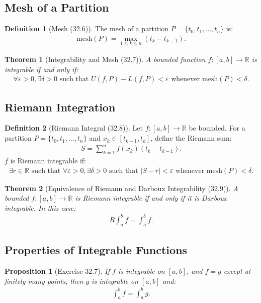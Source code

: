 \documentclass[9pt]{article}
\theoremstyle{definition}
\newtheorem{definition}{Definition}
\theoremstyle{plain}
\newtheorem{theorem}{Theorem}
\newtheorem{proposition}{Proposition}
\begin{document}
\subsection*{Mesh of a Partition}
\begin{definition}[Mesh (32.6)]
The mesh of a partition $ P = \{t_0, t_1, \ldots, t_n\} $ is:
\begin{align}
\text{mesh}(P) = \max_{1 \leq k \leq n} (t_k - t_{k-1}).
\end{align}
\end{definition}

\begin{theorem}[Integrability and Mesh (32.7)]
A bounded function $ f : [a, b] \to \mathbb{R} $ is integrable if and only if:
\begin{align}
\forall \varepsilon > 0, \exists \delta > 0 \text{ such that } U(f, P) - L(f, P) < \varepsilon \text{ whenever mesh}(P) < \delta.
\end{align}
\end{theorem}

\subsection*{Riemann Integration}
\begin{definition}[Riemann Integral (32.8)]
Let $ f : [a, b] \to \mathbb{R} $ be bounded. For a partition $ P = \{t_0, t_1, \ldots, t_n\} $ and $ x_k \in [t_{k-1}, t_k] $, define the Riemann sum:
\begin{align}
S = \sum_{k=1}^n f(x_k)(t_k - t_{k-1}).
\end{align}
$ f $ is Riemann integrable if:
\begin{align}
\exists r \in \mathbb{R} \text{ such that } \forall \varepsilon > 0, \exists \delta > 0 \text{ such that } |S - r| < \varepsilon \text{ whenever mesh}(P) < \delta.
\end{align}
\end{definition}

\begin{theorem}[Equivalence of Riemann and Darboux Integrability (32.9)]
A bounded $ f : [a, b] \to \mathbb{R} $ is Riemann integrable if and only if it is Darboux integrable. In this case:
\begin{align}
R\int_a^b f = \int_a^b f.
\end{align}
\end{theorem}

\subsection*{Properties of Integrable Functions}
\begin{proposition}[Exercise 32.7]
If $ f $ is integrable on $ [a, b] $, and $ f = g $ except at finitely many points, then $ g $ is integrable on $ [a, b] $ and:
\begin{align}
\int_a^b f = \int_a^b g.
\end{align}
\end{proposition}
\end{document}

